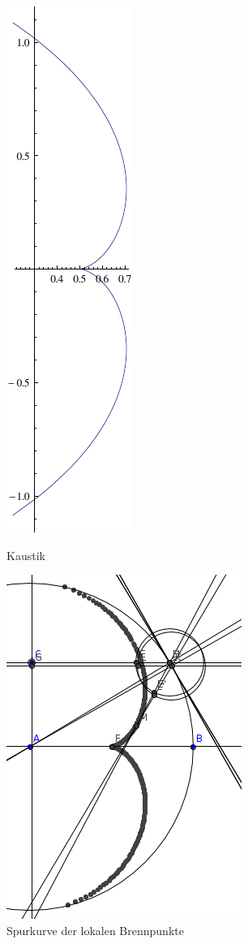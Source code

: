 \documentclass[11pt, ngerman, fleqn]{article}
\begin{document}
\begin{figure}
	\centering
	\begin{minipage}[b]{0.3\textwidth}
		\centering
		\includegraphics[height=0.4\textheight]{zyklo.pdf}
		\caption{Kaustik}
		\label{fig:zyklo}
	\end{minipage}
	\begin{minipage}[b]{0.6\textwidth}
		\centering
		\includegraphics[height=0.4\textheight]{geogebra.png}
		\caption{Spurkurve der lokalen Brennpunkte}
		\label{fig:geo}
	\end{minipage}
\end{figure}
\end{document}
